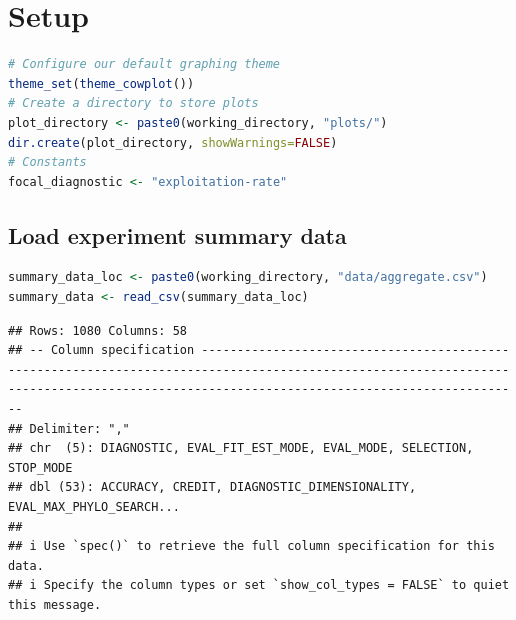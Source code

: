 \documentclass[
]{book}
\begin{document}
\hypertarget{setup}{%
\section{Setup}\label{setup}}

\begin{lstlisting}[language=R]
# Configure our default graphing theme
theme_set(theme_cowplot())
# Create a directory to store plots
plot_directory <- paste0(working_directory, "plots/")
dir.create(plot_directory, showWarnings=FALSE)
# Constants
focal_diagnostic <- "exploitation-rate"
\end{lstlisting}

\hypertarget{load-experiment-summary-data}{%
\subsection{Load experiment summary data}\label{load-experiment-summary-data}}

\begin{lstlisting}[language=R]
summary_data_loc <- paste0(working_directory, "data/aggregate.csv")
summary_data <- read_csv(summary_data_loc)
\end{lstlisting}

\begin{lstlisting}
## Rows: 1080 Columns: 58
## -- Column specification -----------------------------------------------------------------------------------------------------------------------------------------------------------------------------------------
## Delimiter: ","
## chr  (5): DIAGNOSTIC, EVAL_FIT_EST_MODE, EVAL_MODE, SELECTION, STOP_MODE
## dbl (53): ACCURACY, CREDIT, DIAGNOSTIC_DIMENSIONALITY, EVAL_MAX_PHYLO_SEARCH...
## 
## i Use `spec()` to retrieve the full column specification for this data.
## i Specify the column types or set `show_col_types = FALSE` to quiet this message.
\end{lstlisting}
\end{document}
